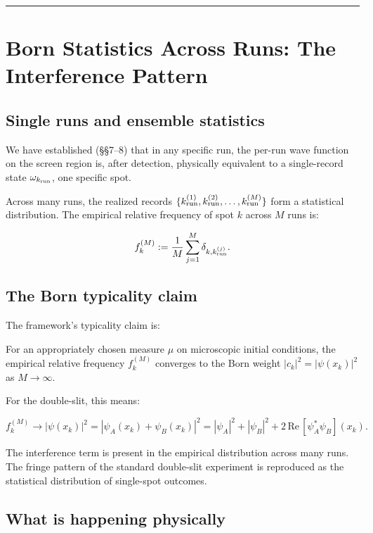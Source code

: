 \documentclass[11pt,a4paper]{article}
\newenvironment{qiqtquote}{\begin{mdframed}[style=quotestyle]}{\end{mdframed}}
\begin{document}
\medskip\hrule\medskip

\section{Born Statistics Across Runs: The Interference Pattern}

\subsection{Single runs and ensemble statistics}

We have established (§§7–8) that in any specific run, the per-run wave function on the screen region is, after detection, physically equivalent to a single-record state $\omega_{k_{\rm run}}$, one specific spot.

Across many runs, the realized records $\{k_{\rm run}^{(1)}, k_{\rm run}^{(2)}, \ldots, k_{\rm run}^{(M)}\}$ form a statistical distribution. The empirical relative frequency of spot $k$ across $M$ runs is:

\[
f_k^{(M)} := \frac{1}{M} \sum_{j=1}^M \delta_{k, k_{\rm run}^{(j)}}.
\]

\subsection{The Born typicality claim}

The framework's typicality claim is:

\begin{qiqtquote}
For an appropriately chosen measure $\mu$ on microscopic initial conditions, the empirical relative frequency $f_k^{(M)}$ converges to the Born weight $|c_k|^2 = |\psi(x_k)|^2$ as $M \to \infty$.
\end{qiqtquote}

For the double-slit, this means:

\[
f_k^{(M)} \to |\psi(x_k)|^2 = |\psi_A(x_k) + \psi_B(x_k)|^2 = |\psi_A|^2 + |\psi_B|^2 + 2\,\mathrm{Re}\,[\psi_A^*\psi_B](x_k).
\]

The interference term is present in the empirical distribution across many runs. The fringe pattern of the standard double-slit experiment is reproduced as the statistical distribution of single-spot outcomes.

\subsection{What is happening physically}
\end{document}
